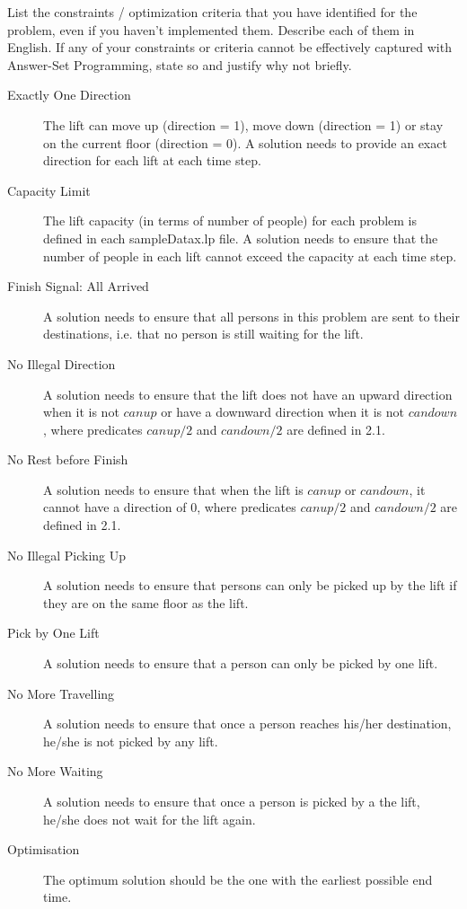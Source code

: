 \documentclass{article}
\begin{document}
\begin{Question}
\begin{Subquestion}
\label{q:list-constraints}
List the constraints / optimization criteria that you have identified for the problem, even if you haven't implemented them.
Describe each of them in English.
If any of your constraints or criteria cannot be effectively captured with Answer-Set Programming, state so and justify why not briefly.
\begin{answer}
\begin{description}
\item[Exactly One Direction] The lift can move up (direction = 1), move down (direction = 1) or stay on the current floor (direction = 0). A solution needs to provide an exact direction for each lift at each time step.
\item[Capacity Limit] The lift capacity (in terms of number of people) for each problem is defined in each sampleDatax.lp file. A solution needs to ensure that the number of people in each lift cannot exceed the capacity at each time step. 
\item[Finish Signal: All Arrived] A solution needs to ensure that all persons in this problem are sent to their destinations, i.e. that no person is still waiting for the lift. 
\item[No Illegal Direction] A solution needs to ensure that the lift does not have an upward direction when it is not $canup$ or have a downward direction when it is not $candown$, where predicates $canup/2$ and $candown/2$ are defined in 2.1.
\item[No Rest before Finish] A solution needs to ensure that when the lift is $canup$ or $candown$, it cannot have a direction of 0, where predicates $canup/2$ and $candown/2$ are defined in 2.1.
\item[No Illegal Picking Up] A solution needs to ensure that persons can only be picked up by the lift if they are on the same floor as the lift. 
\item[Pick by One Lift] A solution needs to ensure that a person can only be picked by one lift.
\item[No More Travelling] A solution needs to ensure that once a person reaches his/her destination, he/she is not picked by any lift. 
\item[No More Waiting] A solution needs to ensure that once a person is picked by a the lift, he/she does not wait for the lift again. 
\item[Optimisation] The optimum solution should be the one with the earliest possible end time.  

\end{description}
\end{answer}
\end{Subquestion}
\end{Question}
\end{document}
